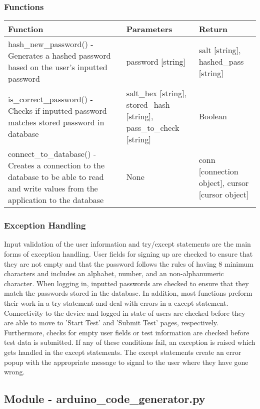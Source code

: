 \documentclass[12pt, titlepage]{article}
\begin{document}
  \subsubsection{Functions}
    \noindent \begin{tabular}{| p{} | p{}| p{}|}
      \hline
      \rowcolor[gray]{0.9}
      Function & Parameters & Return\\
      \hline
      hash\_new\_password() - Generates a hashed password based on the user’s inputted password & password [string] & salt [string], hashed\_pass [string] \\
      \hline
      is\_correct\_password() - Checks if inputted password matches stored password in database & salt\_hex [string], stored\_hash [string], pass\_to\_check [string] & Boolean \\
      \hline
      connect\_to\_database() - Creates a connection to the database to be able to read and write values from the application to the database & None & conn [connection object], cursor [cursor object] \\
      \hline
    \end{tabular}

\newpage

  \subsubsection{Exception Handling}
  Input validation of the user information and try/except statements are the main forms of exception handling. 
  User fields for signing up are checked to ensure that they are not empty and that the password follows the 
  rules of having 8 minimum characters and includes an alphabet, number, and an non-alphanumeric character. 
  When logging in, inputted passwords are checked to ensure that they match the passwords stored in the database.
  In addition, most functions preform their work in a try statement and deal with errors in a except statement.
  Connectivity to the device and logged in state of users are checked before they are able to move to 'Start Test' and 'Submit Test' pages, respectively.
  Furthermore, checks for empty user fields or test information are checked before test data is submitted. If any of these conditions fail, an exception
  is raised which gets handled in the except statements. The except statements create an error popup with the appropriate message to signal to the user
  where they have gone wrong.  

  \subsection{Module - arduino\_code\_generator.py}
\end{document}
